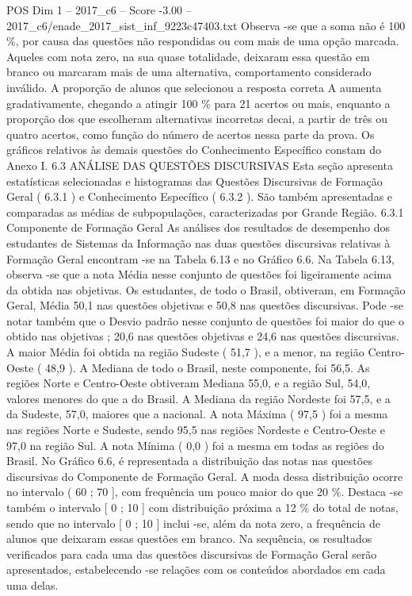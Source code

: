 \begin{textsample}{POS Dim 1 – 2017\_c6 – Score -3.00 – 2017\_c6/enade\_2017\_sist\_inf\_9223c47403.txt}
Observa -se que a soma não é 100 \%, por causa das questões não respondidas ou com mais de uma opção marcada.
Aqueles com nota zero, na sua quase totalidade, deixaram essa questão em branco ou marcaram mais de uma alternativa, comportamento considerado inválido.
A proporção de alunos que selecionou a resposta correta A aumenta gradativamente, chegando a atingir 100 \% para 21 acertos ou mais, enquanto a proporção dos que escolheram alternativas incorretas decai, a partir de três ou quatro acertos, como função do número de acertos nessa parte da prova.
Os gráficos relativos às demais questões do Conhecimento Específico constam do Anexo I. 6.3 ANÁLISE DAS QUESTÕES DISCURSIVAS Esta seção apresenta estatísticas selecionadas e histogramas das Questões Discursivas de Formação Geral ( 6.3.1 ) e Conhecimento Específico ( 6.3.2 ).
São também apresentadas e comparadas as médias de subpopulações, caracterizadas por Grande Região. 6.3.1 Componente de Formação Geral As análises dos resultados de desempenho dos estudantes de Sistemas da Informação nas duas questões discursivas relativas à Formação Geral encontram -se na Tabela 6.13 e no Gráfico 6.6.
Na Tabela 6.13, observa -se que a nota Média nesse conjunto de questões foi ligeiramente acima da obtida nas objetivas.
Os estudantes, de todo o Brasil, obtiveram, em Formação Geral, Média 50,1 nas questões objetivas e 50,8 nas questões discursivas.
Pode -se notar também que o Desvio padrão nesse conjunto de questões foi maior do que o obtido nas objetivas ; 20,6 nas questões objetivas e 24,6 nas questões discursivas.
A maior Média foi obtida na região Sudeste ( 51,7 ), e a menor, na região Centro-Oeste ( 48,9 ).
A Mediana de todo o Brasil, neste componente, foi 56,5.
As regiões Norte e Centro-Oeste obtiveram Mediana 55,0, e a região Sul, 54,0, valores menores do que a do Brasil.
A Mediana da região Nordeste foi 57,5, e a da Sudeste, 57,0, maiores que a nacional.
A nota Máxima ( 97,5 ) foi a mesma nas regiões Norte e Sudeste, sendo 95,5 nas regiões Nordeste e Centro-Oeste e 97,0 na região Sul.
A nota Mínima ( 0,0 ) foi a mesma em todas as regiões do Brasil.
No Gráfico 6.6, é representada a distribuição das notas nas questões discursivas do Componente de Formação Geral.
A moda dessa distribuição ocorre no intervalo ( 60 ; 70 ], com frequência um pouco maior do que 20 \%.
Destaca -se também o intervalo [ 0 ; 10 ] com distribuição próxima a 12 \% do total de notas, sendo que no intervalo [ 0 ; 10 ] inclui -se, além da nota zero, a frequência de alunos que deixaram essas questões em branco.
Na sequência, os resultados verificados para cada uma das questões discursivas de Formação Geral serão apresentados, estabelecendo -se relações com os conteúdos abordados em cada uma delas.

\end{textsample}
